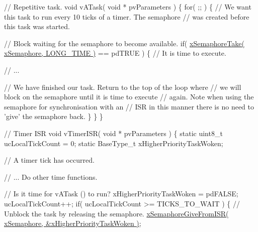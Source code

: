 \begin{DoxyPre}// Repetitive task.
void vATask( void * pvParameters )
\{
   for( ;; )
   \{
       // We want this task to run every 10 ticks of a timer.  The semaphore
       // was created before this task was started.\end{DoxyPre}



\begin{DoxyPre}       // Block waiting for the semaphore to become available.
       if( \hyperlink{vendor_2ceedling_2plugins_2freertos_2src_2freertos_2include_2semphr_8h_af116e436d2a5ae5bd72dbade2b5ea930}{xSemaphoreTake( xSemaphore, LONG\_TIME )} == pdTRUE )
       \{
           // It is time to execute.\end{DoxyPre}



\begin{DoxyPre}           // ...\end{DoxyPre}



\begin{DoxyPre}           // We have finished our task.  Return to the top of the loop where
           // we will block on the semaphore until it is time to execute
           // again.  Note when using the semaphore for synchronisation with an
        // ISR in this manner there is no need to 'give' the semaphore back.
       \}
   \}
\}\end{DoxyPre}



\begin{DoxyPre}// Timer ISR
void vTimerISR( void * pvParameters )
\{
static uint8\_t ucLocalTickCount = 0;
static BaseType\_t xHigherPriorityTaskWoken;\end{DoxyPre}



\begin{DoxyPre}   // A timer tick has occurred.\end{DoxyPre}



\begin{DoxyPre}   // ... Do other time functions.\end{DoxyPre}



\begin{DoxyPre}   // Is it time for vATask () to run?
   xHigherPriorityTaskWoken = pdFALSE;
   ucLocalTickCount++;
   if( ucLocalTickCount >= TICKS\_TO\_WAIT )
   \{
       // Unblock the task by releasing the semaphore.
       \hyperlink{vendor_2ceedling_2plugins_2freertos_2src_2freertos_2include_2semphr_8h_a68aa43df8b2a0dbe17d05fad74670ef0}{xSemaphoreGiveFromISR( xSemaphore, &xHigherPriorityTaskWoken )};\end{DoxyPre}



